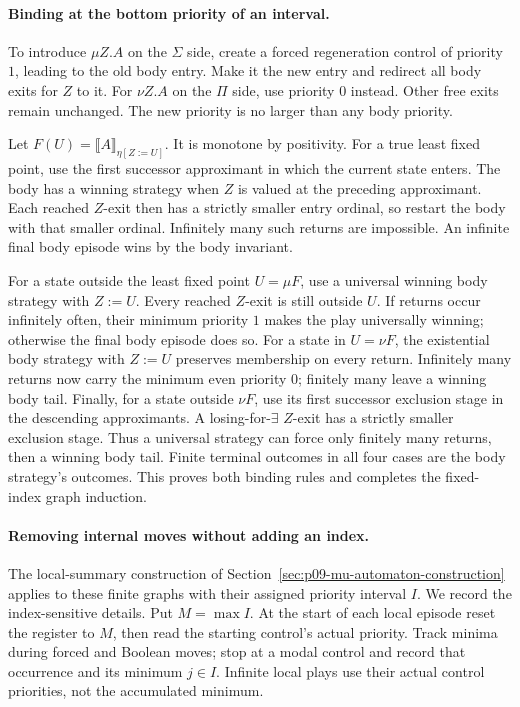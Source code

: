 \paragraph{Binding at the bottom priority of an interval.}
To introduce \(\mu Z.A\)
on the \(\Sigma\) side,
create a forced regeneration
control of priority \(1\),
leading to the old body
entry. Make it the new
entry and redirect all
body exits for \(Z\)
to it. For \(\nu Z.A\)
on the \(\Pi\) side,
use priority \(0\) instead.
Other free exits remain
unchanged. The new priority
is no larger than any
body priority.

Let
\(F(U)=\llbracket A\rrbracket_{\eta[Z:=U]}\).
It is monotone by positivity.
For a true least fixed
point, use the first
successor approximant in
which the current state
enters. The body has a
winning strategy when \(Z\)
is valued at the preceding
approximant. Each reached
\(Z\)-exit then has a
strictly smaller entry
ordinal, so restart the
body with that smaller
ordinal. Infinitely many
such returns are impossible.
An infinite final body
episode wins by the
body invariant.

For a state outside
the least fixed point
\(U=\mu F\), use a
universal winning body
strategy with \(Z:=U\).
Every reached \(Z\)-exit
is still outside \(U\).
If returns occur infinitely
often, their minimum priority
\(1\) makes the play
universally winning; otherwise
the final body episode
does so.
For a state in
\(U=\nu F\), the
existential body strategy
with \(Z:=U\) preserves
membership on every return.
Infinitely many returns
now carry the minimum
even priority \(0\);
finitely many leave a
winning body tail.
Finally, for a state
outside \(\nu F\),
use its first successor
exclusion stage in the
descending approximants.
A losing-for-\(\exists\)
\(Z\)-exit has a
strictly smaller exclusion
stage. Thus a universal
strategy can force only
finitely many returns,
then a winning body tail.
Finite terminal outcomes
in all four cases are
the body strategy's outcomes.
This proves both binding
rules and completes the
fixed-index graph induction.

\paragraph{Removing internal moves without adding an index.}
The local-summary construction
of Section~\ref{sec:p09-mu-automaton-construction}
applies to these finite
graphs with their assigned
priority interval \(I\).
We record the index-sensitive
details. Put \(M=\max I\).
At the start of each
local episode reset the
register to \(M\), then
read the starting control's
actual priority.
Track minima during forced
and Boolean moves; stop
at a modal control and
record that occurrence
and its minimum \(j\in I\).
Infinite local plays use
their actual control
priorities, not the
accumulated minimum.

